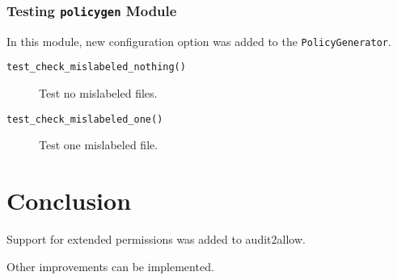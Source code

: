 \subsection{Testing \texttt{policygen} Module}
In this module, new configuration option was added to the
\texttt{PolicyGenerator}.
\begin{description}
    \item [\texttt{test\_check\_mislabeled\_nothing()}] Test no mislabeled
        files.
    \item [\texttt{test\_check\_mislabeled\_one()}] Test one mislabeled file.
\end{description}

\chapter{Conclusion}



Support for extended permissions was added to audit2allow.

Other improvements can be implemented.
